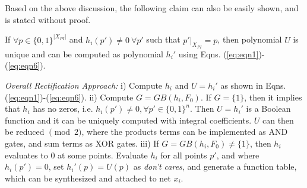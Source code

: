 
Based on the above discussion, the following claim can also be easily
shown, and is stated without proof.
\begin{Corollary}
\label{thm:quo2}
If $\forall p \in \{0,1\}^{|X_{PI}|}$ and $h_i(p') \neq 0\ \forall p'$
such that $p'|_{X_{PI}} = p$, then polynomial $U$ is unique and can be
computed as polynomial $h_i'$ using Eqns. (\ref{eq:eqn1})-(\ref{eq:eqn6}).  
\end{Corollary}



{\it Overall Rectification Approach:} i) Compute $h_i$ and $U=h_i'$ as
shown in  Eqns. (\ref{eq:eqn1})-(\ref{eq:eqn6}). ii) Compute $G =
GB(h_i, F_0)$. If $G = \{1\}$, then it implies that $h_i$ has no
zeros, i.e. $h_i(p')\neq 0, \forall p' \in \{0,1\}^n$. Then $U=h_i'$ is a
Boolean function and it can be uniquely computed with integral
coefficients. $U$ can then be reduced $\pmod{ 2}$, where the products
terms can be implemented as AND gates, and sum terms as XOR
gates. iii) If $G = GB(h_i, F_0) \neq \{1\}$, then $h_i$ evaluates to
0 at some points. Evaluate $h_i$ for all points $p'$, and where
$h_i(p')=0$, set $h_i'(p)=U(p)$ as {\it don't cares}, and generate a
function table, which can be synthesized and attached to net $x_i$. 















